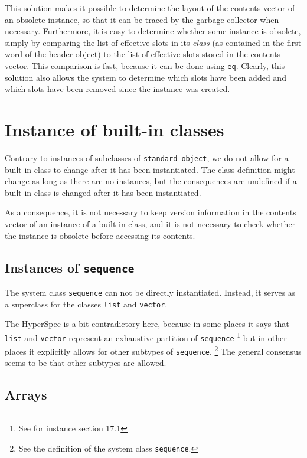 This solution makes it possible to determine the layout of the
contents vector of an obsolete instance, so that it can be traced by
the garbage collector when necessary.  Furthermore, it is easy to
determine whether some instance is obsolete, simply by comparing the
list of effective slots in its \emph{class} (as contained in the first
word of the header object) to the list of effective slots stored in
the contents vector.  This comparison is fast, because it can be done
using \texttt{eq}.  Clearly, this solution also allows the system to
determine which slots have been added and which slots have been
removed since the instance was created. 

\section{Instance of built-in classes}

Contrary to instances of subclasses of \texttt{standard-object}, we do
not allow for a built-in class to change after it has been
instantiated.  The class definition might change as long as there are
no instances, but the consequences are undefined if a built-in class
is changed after it has been instantiated.

As a consequence, it is not necessary to keep version information in
the contents vector of an instance of a built-in class, and it is not
necessary to check whether the instance is obsolete before accessing
its contents.  

\subsection{Instances of \texttt{sequence}}

The system class \texttt{sequence} can not be directly instantiated.
Instead, it serves as a superclass for the classes \texttt{list} and
\texttt{vector}.  

The HyperSpec is a bit contradictory here, because
in some places it says that \texttt{list} and \texttt{vector}
represent an exhaustive partition of \texttt{sequence}%
\footnote{See for instance section 17.1}
but in other places it explicitly allows for other subtypes of
\texttt{sequence}.%
\footnote{See the definition of the system class \texttt{sequence}.}
The general consensus seems to be that other subtypes are allowed. 


\subsection{Arrays}
\label{sec-data-representation-arrays}

